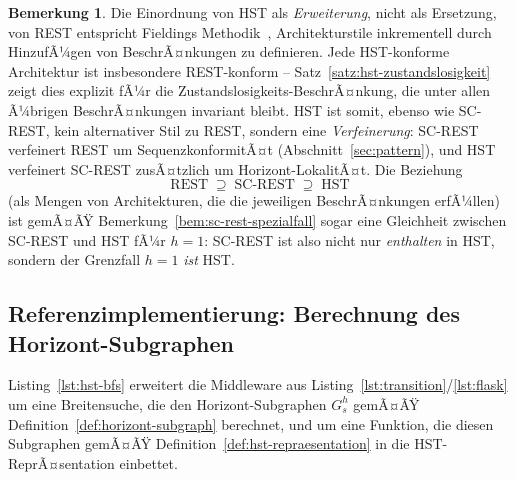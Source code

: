 ﻿\documentclass[a4paper,12pt]{article}
\theoremstyle{definition}
\newtheorem{bemerkung}{Bemerkung}
\begin{document}
\begin{bemerkung}
	Die Einordnung von HST als \emph{Erweiterung}, nicht als Ersetzung, von REST
	entspricht Fieldings Methodik~\cite{fielding2000}, Architekturstile inkrementell
	durch HinzufÃ¼gen von BeschrÃ¤nkungen zu definieren. Jede HST-konforme Architektur ist
	insbesondere REST-konform -- Satz~\ref{satz:hst-zustandslosigkeit} zeigt dies
	explizit fÃ¼r die Zustandslosigkeits-BeschrÃ¤nkung, die unter allen Ã¼brigen
	BeschrÃ¤nkungen invariant bleibt. HST ist somit, ebenso wie SC-REST, kein
	alternativer Stil zu REST, sondern eine \emph{Verfeinerung}: SC-REST verfeinert REST
	um SequenzkonformitÃ¤t (Abschnitt~\ref{sec:pattern}), und HST verfeinert SC-REST
	zusÃ¤tzlich um Horizont-LokalitÃ¤t. Die Beziehung
	\[
		\text{REST} \;\supseteq\; \text{SC-REST} \;\supseteq\; \text{HST}
	\]
	(als Mengen von Architekturen, die die jeweiligen BeschrÃ¤nkungen erfÃ¼llen) ist
	gemÃ¤ÃŸ Bemerkung~\ref{bem:sc-rest-spezialfall} sogar eine Gleichheit zwischen
	SC-REST und HST fÃ¼r $h=1$: SC-REST ist also nicht nur \emph{enthalten} in HST,
	sondern der Grenzfall $h=1$ \emph{ist} HST.
\end{bemerkung}

\subsection{Referenzimplementierung: Berechnung des Horizont-Subgraphen}
\label{sec:hst-implementierung}

Listing~\ref{lst:hst-bfs} erweitert die Middleware aus
Listing~\ref{lst:transition}/\ref{lst:flask} um eine Breitensuche, die den
Horizont-Subgraphen $G_s^h$ gemÃ¤ÃŸ Definition~\ref{def:horizont-subgraph} berechnet, und
um eine Funktion, die diesen Subgraphen gemÃ¤ÃŸ Definition~\ref{def:hst-repraesentation} in
die HST-ReprÃ¤sentation einbettet.
\end{document}
